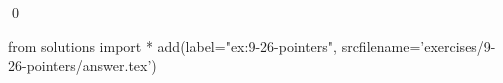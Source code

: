 
\begin{ex}
  \label{ex:9-26-pointers}
  
  \qed
\end{ex}
\begin{python0}
from solutions import *
add(label="ex:9-26-pointers",
    srcfilename='exercises/9-26-pointers/answer.tex')
\end{python0}
